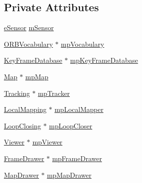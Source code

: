 \subsection*{Private Attributes}
\begin{DoxyCompactItemize}
\item 
\mbox{\hyperlink{class_o_r_b___s_l_a_m2_1_1_system_a3f14b84bb9663e1129e649e592bd14cf}{e\+Sensor}} \mbox{\hyperlink{class_o_r_b___s_l_a_m2_1_1_system_a6e2c6a2e12b887481a564e0f95912d40}{m\+Sensor}}
\item 
\mbox{\hyperlink{namespace_o_r_b___s_l_a_m2_a2fafba714858cab1bb18d438e2e83c5d}{O\+R\+B\+Vocabulary}} $\ast$ \mbox{\hyperlink{class_o_r_b___s_l_a_m2_1_1_system_a30df3414ecc346463295d8138c80af2f}{mp\+Vocabulary}}
\item 
\mbox{\hyperlink{class_o_r_b___s_l_a_m2_1_1_key_frame_database}{Key\+Frame\+Database}} $\ast$ \mbox{\hyperlink{class_o_r_b___s_l_a_m2_1_1_system_a6cadd57703ba94de84c00876bf554d2f}{mp\+Key\+Frame\+Database}}
\item 
\mbox{\hyperlink{class_o_r_b___s_l_a_m2_1_1_map}{Map}} $\ast$ \mbox{\hyperlink{class_o_r_b___s_l_a_m2_1_1_system_a47daae04f6006cb21d7b00b5541d2bca}{mp\+Map}}
\item 
\mbox{\hyperlink{class_o_r_b___s_l_a_m2_1_1_tracking}{Tracking}} $\ast$ \mbox{\hyperlink{class_o_r_b___s_l_a_m2_1_1_system_a4170bdaefc0ea8fc5aad6b6e782f2dc4}{mp\+Tracker}}
\item 
\mbox{\hyperlink{class_o_r_b___s_l_a_m2_1_1_local_mapping}{Local\+Mapping}} $\ast$ \mbox{\hyperlink{class_o_r_b___s_l_a_m2_1_1_system_a7597aee894baff53015605762c134b57}{mp\+Local\+Mapper}}
\item 
\mbox{\hyperlink{class_o_r_b___s_l_a_m2_1_1_loop_closing}{Loop\+Closing}} $\ast$ \mbox{\hyperlink{class_o_r_b___s_l_a_m2_1_1_system_ad722b80260f1ab8292ec8b7951047348}{mp\+Loop\+Closer}}
\item 
\mbox{\hyperlink{class_o_r_b___s_l_a_m2_1_1_viewer}{Viewer}} $\ast$ \mbox{\hyperlink{class_o_r_b___s_l_a_m2_1_1_system_a4f89f0644efa2054604a53ffa8dbd4e7}{mp\+Viewer}}
\item 
\mbox{\hyperlink{class_o_r_b___s_l_a_m2_1_1_frame_drawer}{Frame\+Drawer}} $\ast$ \mbox{\hyperlink{class_o_r_b___s_l_a_m2_1_1_system_aa8e76b84fb1c3e90320903984328fec4}{mp\+Frame\+Drawer}}
\item 
\mbox{\hyperlink{class_o_r_b___s_l_a_m2_1_1_map_drawer}{Map\+Drawer}} $\ast$ \mbox{\hyperlink{class_o_r_b___s_l_a_m2_1_1_system_a45f69b6579fdea93c692e52dbd9b0614}{mp\+Map\+Drawer}}
\item 

\end{DoxyCompactItemize}
